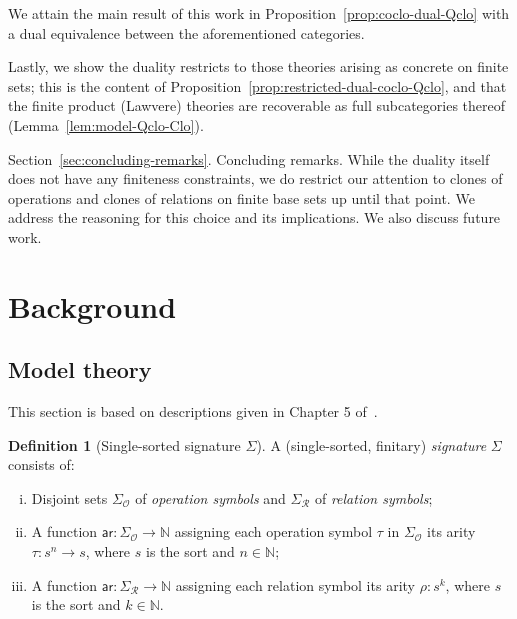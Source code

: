 \documentclass[11pt, a4paper, twoside,leqno]{amsart}
\renewcommand{\O}{{\mathcal O}}
\newcommand{\R}{{\mathcal R}}
\numberwithin{equation}{section}
\theoremstyle{plain}
\theoremstyle{definition}
\newtheorem{Defn}[Thm]{Definition}
\begin{document}
  We attain the main result of this work in
Proposition~\ref{prop:coclo-dual-Qclo} with a dual
equivalence between the aforementioned categories.

Lastly, we show the duality restricts to those theories arising as concrete on finite
sets; this is the content of
Proposition~\ref{prop:restricted-dual-coclo-Qclo}, and that the finite product (Lawvere) theories are
recoverable as full subcategories thereof
(Lemma~\ref{lem:model-Qclo-Clo}).

  
Section~\ref{sec:concluding-remarks}.
Concluding remarks. While the duality itself does not have any finiteness constraints, we do
restrict our attention to clones of operations and clones of
relations on finite base sets up until that point. We address the
reasoning for this choice and its 
implications. We also discuss future work.


\section{Background}
\label{sec:background}



\subsection{Model theory}
\label{sec:logic-background}
This section is based on descriptions given in Chapter 5 of~\cite{Adamek:1994aa}.
\begin{Defn}[Single-sorted signature \(\Sigma\)]
  \label{def:1-signature}
  A (single-sorted, finitary) \emph{signature} \(\Sigma\) consists of:
  \begin{enumerate}[(i)]
  \item Disjoint sets \(\Sigma_{\O}\) of \emph{operation symbols} and
    \(\Sigma_{\R}\) of \emph{relation symbols};
  \item A function
    \(\mathsf{ar} \colon \Sigma_{\O}\rightarrow \mathbb{N}\)
    assigning each operation symbol \(\tau\) in \(\Sigma_{\O}\) its arity
    \(\tau \colon s^{n} \rightarrow s\), where
    \(s\) is the sort and \(n\in \mathbb{N}\);
  \item A function
    \(\mathsf{ar} \colon \Sigma_{\R}\rightarrow \mathbb{N}\)
    assigning each relation symbol its arity
    \(\rho \colon s^{k}\), where
    \(s\) is the sort and \(k \in \mathbb{N} \).
  \end{enumerate}
\end{Defn}
\end{document}
